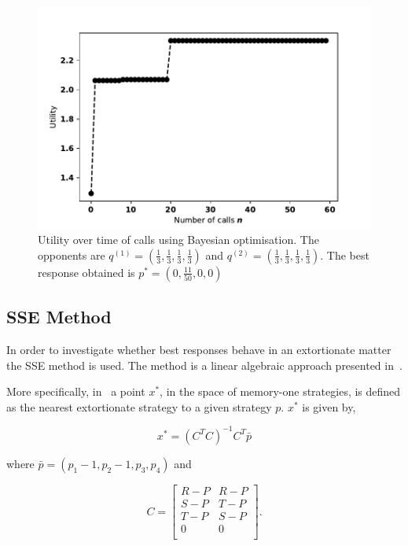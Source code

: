 \begin{figure}[!htbp]
    \begin{center}
    \includegraphics[width=.5\linewidth]{src/chapters/05/paper/memory-size-in-the-prisoners-dilemma/img/bayesian_example.pdf}
    \end{center}
    \caption{Utility over time of calls using Bayesian optimisation. The
    opponents are \(q^{(1)} = (\frac{1}{3}, \frac{1}{3}, \frac{1}{3},
    \frac{1}{3})\) and \(q^{(2)} = (\frac{1}{3}, \frac{1}{3},
    \frac{1}{3}, \frac{1}{3})\). The best response obtained is \(p^* = (0, \frac{11}{50}, 0, 0)\)}
    \label{bayesian_example}
\end{figure}

\subsection{SSE Method}\label{section:sse}

In order to investigate whether best responses behave in an extortionate matter
the SSE method is used. The method is a linear algebraic approach presented
in~\cite{Knight2019}.

More specifically, in~\cite{Knight2019} a point \(x^*\), in the space of
memory-one strategies, is defined as the nearest extortionate strategy to a
given strategy \(p\). \(x^*\) is given by,

\begin{equation}\label{eqn:x_star_formula}
    x^* = {\left(C^{T}C\right)}^{-1}C^{T}\bar{p}
\end{equation}

where \(\bar{p}=(p_1 - 1, p_2 - 1, p_3, p_4)\) and

\begin{equation}\label{eq:definition_of_C}
    C =
    \begin{bmatrix}
        R - P & R- P \\
        S - P & T- P \\
        T - P & S- P \\
        0     & 0 \\
    \end{bmatrix}.
\end{equation}

